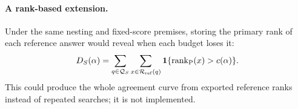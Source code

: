 \paragraph{A rank-based extension.}
Under the same nesting and fixed-score premises, storing the primary
rank of each reference answer would reveal when each budget loses it:
\begin{equation}
 D_S(\alpha)=\sum_{q\in\mathcal Q_S}\sum_{x\in\mathcal R_{\rm ref}(q)}
 \mathbf1\{\operatorname{rank}_{\rm P}(x)>c(\alpha)\}.
 \label{eq:6-rank-curve}
\end{equation}
This could produce the whole agreement curve from exported reference
ranks instead of repeated searches; it is not implemented.
